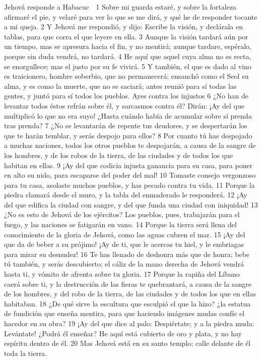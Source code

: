 Jehová responde a Habacuc

1 Sobre mi guarda estaré, y sobre la fortaleza afirmaré el pie, y velaré para ver lo que se me dirá, y qué he de responder tocante a mi queja.
2 Y Jehová me respondió, y dijo: Escribe la visión, y declárala en tablas, para que corra el que leyere en ella.
3 Aunque la visión tardará aún por un tiempo, mas se apresura hacia el fin, y no mentirá; aunque tardare, espéralo, porque sin duda vendrá, no tardará. 
4 He aquí que aquel cuya alma no es recta, se enorgullece; mas el justo por su fe vivirá. 
5 Y también, el que es dado al vino es traicionero, hombre soberbio, que no permanecerá; ensanchó como el Seol su alma, y es como la muerte, que no se saciará; antes reunió para sí todas las gentes, y juntó para sí todos los pueblos.
Ayes contra los injustos
6 ¿No han de levantar todos éstos refrán sobre él, y sarcasmos contra él? Dirán: ¡Ay del que multiplicó lo que no era suyo! ¿Hasta cuándo había de acumular sobre sí prenda tras prenda?
7 ¿No se levantarán de repente tus deudores, y se despertarán los que te harán temblar, y serás despojo para ellos?
8 Por cuanto tú has despojado a muchas naciones, todos los otros pueblos te despojarán, a causa de la sangre de los hombres, y de los robos de la tierra, de las ciudades y de todos los que habitan en ellas.
9 ¡Ay del que codicia injusta ganancia para su casa, para poner en alto su nido, para escaparse del poder del mal!
10 Tomaste consejo vergonzoso para tu casa, asolaste muchos pueblos, y has pecado contra tu vida.
11 Porque la piedra clamará desde el muro, y la tabla del enmaderado le responderá.
12 ¡Ay del que edifica la ciudad con sangre, y del que funda una ciudad con iniquidad!
13 ¿No es esto de Jehová de los ejércitos? Los pueblos, pues, trabajarán para el fuego, y las naciones se fatigarán en vano.
14 Porque la tierra será llena del conocimiento de la gloria de Jehová, como las aguas cubren el mar. 
15 ¡Ay del que da de beber a su prójimo! ¡Ay de ti, que le acercas tu hiel, y le embriagas para mirar su desnudez!
16 Te has llenado de deshonra más que de honra; bebe tú también, y serás descubierto; el cáliz de la mano derecha de Jehová vendrá hasta ti, y vómito de afrenta sobre tu gloria.
17 Porque la rapiña del Líbano caerá sobre ti, y la destrucción de las fieras te quebrantará, a causa de la sangre de los hombres, y del robo de la tierra, de las ciudades y de todos los que en ellas habitaban.
18 ¿De qué sirve la escultura que esculpió el que la hizo? ¿la estatua de fundición que enseña mentira, para que haciendo imágenes mudas confíe el hacedor en su obra?
19 ¡Ay del que dice al palo: Despiértate; y a la piedra muda: Levántate! ¿Podrá él enseñar? He aquí está cubierto de oro y plata, y no hay espíritu dentro de él.
20 Mas Jehová está en su santo templo; calle delante de él toda la tierra.

